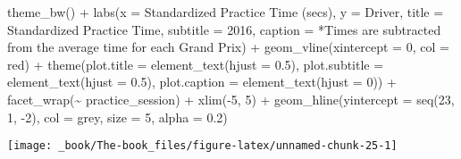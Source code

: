 \documentclass[
]{book}
\newenvironment{Shaded}{\begin{snugshade}}{\end{snugshade}}
\newcommand{\AttributeTok}[1]{\textcolor[rgb]{0.77,0.63,0.00}{#1}}
\newcommand{\DecValTok}[1]{\textcolor[rgb]{0.00,0.00,0.81}{#1}}
\newcommand{\FloatTok}[1]{\textcolor[rgb]{0.00,0.00,0.81}{#1}}
\newcommand{\FunctionTok}[1]{\textcolor[rgb]{0.00,0.00,0.00}{#1}}
\newcommand{\NormalTok}[1]{#1}
\newcommand{\SpecialCharTok}[1]{\textcolor[rgb]{0.00,0.00,0.00}{#1}}
\newcommand{\StringTok}[1]{\textcolor[rgb]{0.31,0.60,0.02}{#1}}
\begin{document}
\begin{Shaded}
\begin{Highlighting}[]
   \FunctionTok{theme\_bw}\NormalTok{() }\SpecialCharTok{+}
   \FunctionTok{labs}\NormalTok{(}\AttributeTok{x =} \StringTok{\textquotesingle{}Standardized Practice Time (secs)\textquotesingle{}}\NormalTok{,}
        \AttributeTok{y =} \StringTok{\textquotesingle{}Driver\textquotesingle{}}\NormalTok{,}
        \AttributeTok{title =} \StringTok{\textquotesingle{}Standardized Practice Time\textquotesingle{}}\NormalTok{,}
        \AttributeTok{subtitle =} \StringTok{\textquotesingle{}2016\textquotesingle{}}\NormalTok{,}
        \AttributeTok{caption =} \StringTok{\textquotesingle{}*Times are subtracted from the average time for each Grand Prix\textquotesingle{}}\NormalTok{) }\SpecialCharTok{+}
   \FunctionTok{geom\_vline}\NormalTok{(}\AttributeTok{xintercept =} \DecValTok{0}\NormalTok{, }\AttributeTok{col =} \StringTok{\textquotesingle{}red\textquotesingle{}}\NormalTok{) }\SpecialCharTok{+}
   \FunctionTok{theme}\NormalTok{(}\AttributeTok{plot.title =} \FunctionTok{element\_text}\NormalTok{(}\AttributeTok{hjust =} \FloatTok{0.5}\NormalTok{),}
         \AttributeTok{plot.subtitle =} \FunctionTok{element\_text}\NormalTok{(}\AttributeTok{hjust =} \FloatTok{0.5}\NormalTok{),}
         \AttributeTok{plot.caption =} \FunctionTok{element\_text}\NormalTok{(}\AttributeTok{hjust =} \DecValTok{0}\NormalTok{)) }\SpecialCharTok{+}
  \FunctionTok{facet\_wrap}\NormalTok{(}\SpecialCharTok{\textasciitilde{}}\NormalTok{ practice\_session) }\SpecialCharTok{+}
  \FunctionTok{xlim}\NormalTok{(}\SpecialCharTok{{-}}\DecValTok{5}\NormalTok{, }\DecValTok{5}\NormalTok{) }\SpecialCharTok{+}
  \FunctionTok{geom\_hline}\NormalTok{(}\AttributeTok{yintercept =} \FunctionTok{seq}\NormalTok{(}\DecValTok{23}\NormalTok{, }\DecValTok{1}\NormalTok{, }\SpecialCharTok{{-}}\DecValTok{2}\NormalTok{), }\AttributeTok{col =} \StringTok{\textquotesingle{}grey\textquotesingle{}}\NormalTok{, }\AttributeTok{size =} \DecValTok{5}\NormalTok{, }\AttributeTok{alpha =}  \FloatTok{0.2}\NormalTok{)}
\end{Highlighting}
\end{Shaded}

\begin{center}\texttt{[image: \_book/The-book\_files/figure-latex/unnamed-chunk-25-1]} \end{center}
\end{document}
